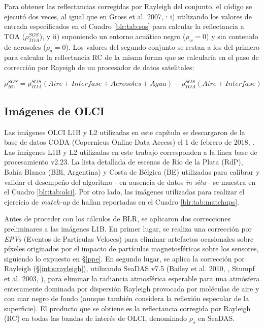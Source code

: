         Para obtener las reflectancias corregidas por Rayleigh del conjunto, el código se ejecutó dos veces, al igual que en Gross et al. 2007, \cite{gross2007}: i) utilizando los valores de entrada especificados en el Cuadro \ref{blr:tab:sos} para calcular la reflectancia a TOA ($\rho_{TOA}^{SOS}$), y ii) suponiendo un entorno acuático negro ($\rho_{w}=0$) y sin contenido de aerosoles ($\rho_{a}=0$). Los valores del segundo conjunto se restan a los del primero para calcular la reflectancia RC de la misma forma que se calcularía en el paso de corrección por Rayeigh de un procesador de datos satelitales:

        \begin{equation}
        \rho^{SOS}_{RC} = \rho^{SOS}_{TOA}(Aire + Interfase + Aerosoles + Agua) - \rho^{SOS}_{TOA}(Aire + Interfase)
        \label{blr:eq:sosray}
        \end{equation}

    \subsection{Imágenes de OLCI}
    \label{blr:s:olci}
    
        Las imágenes OLCI L1B y L2 utilizadas en este capítulo se descargaron de la base de datos CODA (Copernicus Online Data Access) el 1 de febrero de 2018, \cite{coda}. Las imágenes L1B y L2 utilizadas en este trabajo corresponden a la línea base de procesamiento v2.23. La lista detallada de escenas de Río de la Plata (RdP), Bahía Blanca (BBl, Argentina) y Costa de Bélgica (BE) utilizadas para calibrar y validar el desempeño del algoritmo - en ausencia de datos \textit{in situ} - se muestra en el Cuadro \ref{blr:tab:olci}. Por otro lado, las imágenes utilizadas para realizar el ejercicio de \textit{match-up} de hallan reportadas en el Cuadro \ref{blr:tab:matchups}.
        
        Antes de proceder con los cálculos de BLR, se aplicaron dos correcciones preliminares a las imágenes L1B. En primer lugar, se realiza una corrección por \textit{EPVs} (Eventos de Partículas Veloces) para eliminar artefactos ocasionales sobre píxeles originados por el impacto de partículas magnetosféricas sobre los sensores, siguiendo lo expuesto en \S \ref{ppe}. En segundo lugar, se aplica la corrección por Rayleigh (\S \ref{int:s:rayleigh}), utilizando SeaDAS v7.5 (Bailey et al. 2010, \cite{bailey2010}, Stumpf et al. 2003, \cite{stumpf2003}), para eliminar la radiancia atmosférica esperable para una atmósfera enteramente dominada por dispersión Rayleigh provocada por moléculas de aire y con mar negro de fondo (aunque también considera la reflexión especular de la superficie). El producto que se obtiene es la reflectancia corregida por Rayleigh (RC) en todas las bandas de interés de OLCI, denominado $\rho_{s}$ en SeaDAS.
        
